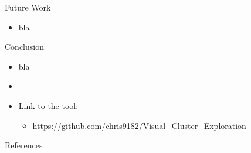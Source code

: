 \documentclass[aspectratio=169]{beamer}
\begin{document}
\begin{frame}{Future Work}

	\begin{itemize}
	 	\item bla
	\end{itemize}

\end{frame}


\begin{frame}{Conclusion}

	\begin{itemize}
		\item bla
		\item[]
		\item Link to the tool:
		\begin{itemize}
			\item \url{https://github.com/chris9182/Visual_Cluster_Exploration}
		\end{itemize}
	\end{itemize}

\end{frame}

\begin{frame}[allowframebreaks]{References}
\printbibliography
\end{frame}
\end{document}
